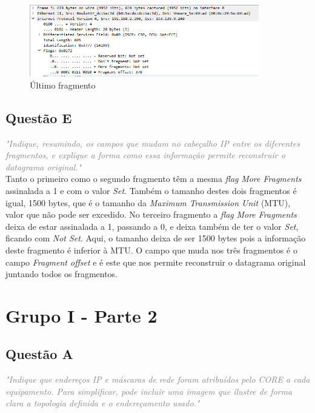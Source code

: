 \documentclass{llncs}
\newcommand{\questionE}[1]{\textcolor{gray}{\textit{"#1"}}}
\begin{document}
\begin{figure}[H]
\begin{center}
\includegraphics[width=10cm]{3dFrame3temMoreFragmentsA0.PNG}
\end{center}
\caption{Último fragmento}
\end{figure}

\clearpage

\subsection{Questão E}
\hspace{3mm}
\questionE{Indique, resumindo, os campos que mudam no cabeçalho IP entre os diferentes fragmentos, e explique a forma como essa informação permite reconstruir o datagrama original.}\\

Tanto o primeiro como o segundo fragmento têm a mesma \textit{flag} \textit{More Fragments} assinalada a 1 e com o valor \textit{Set}. Também o tamanho destes dois fragmentos é igual, 1500 bytes, que é o tamanho da \textit{Maximum Transmission Unit} (MTU), valor que não pode ser excedido. No terceiro fragmento a \textit{flag} \textit{More Fragments} deixa de estar assinalada a 1, passando a 0, e deixa também de ter o valor \textit{Set}, ficando com \textit{Not Set}. Aqui, o tamanho deixa de ser 1500 bytes pois a informação deste fragmento é inferior à MTU. O campo que muda nos três fragmentos é o campo \textit{Fragment offset} e é este que nos permite reconstruir o datagrama original juntando todos os fragmentos.

\clearpage

\section{Grupo I - Parte 2}

\subsection{Questão A}
\hspace{3mm} 
\questionE{Indique que endereços IP e máscaras de rede foram atribuídos pelo CORE a cada equipamento. Para simplificar, pode incluir uma imagem que ilustre de forma clara a topologia definida e o endereçamento usado.}\\
\end{document}
